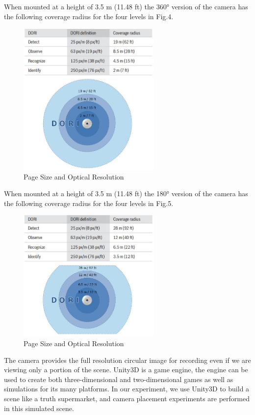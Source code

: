 When mounted at a height of 3.5 m (11.48 ft) the 360° version of the camera has the following coverage radius for the four levels in Fig.4.
\begin{figure}[htbp]
\centerline{\includegraphics[width=7cm,scale=0.8]{camera360.jpg}}
\caption{Page Size and Optical Resolution}
\label{fig}
\end{figure}

When mounted at a height of 3.5 m (11.48 ft) the 180° version of the camera has the following coverage radius for the four levels in Fig.5.
\begin{figure}[htbp]
\centerline{\includegraphics[width=7cm,scale=0.8]{camera180.jpg}}
\caption{Page Size and Optical Resolution}
\label{fig}
\end{figure}
The camera provides the full resolution circular image for recording even if we are viewing only a portion of the scene.
Unity3D is a game engine, the engine can be used to create both three-dimensional and two-dimensional games as well as simulations for its many platforms.
In our experiment, we use Unity3D to build a scene like a truth supermarket, and camera placement experiments are performed in this simulated scene.


